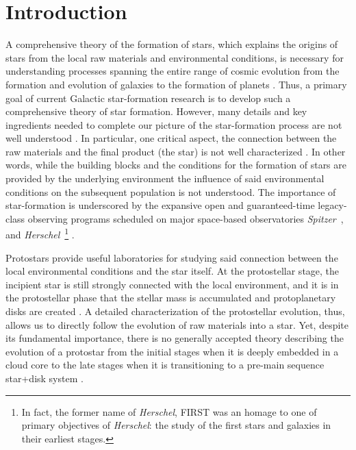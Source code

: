 \documentclass[manuscript]{aastex}
\newcommand{\herschel}{{\em Herschel}}
\newcommand{\spitzer}{{\em Spitzer}}
\begin{document}
\section{Introduction}
\par
A comprehensive theory of the formation of stars, which explains the origins of stars from the local raw materials and environmental conditions, is necessary for understanding processes spanning the entire range of cosmic evolution from the formation and evolution of galaxies to the formation of planets \citep{ke2012}.  Thus, a primary goal of current Galactic star-formation research is to develop such a comprehensive theory of star formation. However, many details and key ingredients needed to complete our picture of the star-formation process are not well understood \citep{mo07}.  In particular, one critical aspect, the connection between the raw materials and the final product (the star) is not well characterized \citep{dunham}.  In other words, while the building blocks and the conditions for the formation of stars are provided by the underlying environment the influence of said environmental conditions on the subsequent population is not understood.  The importance of star-formation is underscored by the expansive open and guaranteed-time legacy-class observing programs scheduled on major space-based observatories \spitzer\ \citep{spitzer}, and \herschel\ \footnote{In fact, the former name of \herschel, FIRST was an homage to one of primary objectives of \herschel: the study of the first stars and galaxies in their earliest stages.} \citep{herschel}.
\par
Protostars provide useful laboratories for studying said connection between the local environmental conditions and the star itself.  At the protostellar stage, the incipient star is still strongly connected with the local environment, and it is in the protostellar phase that the stellar mass is accumulated and protoplanetary disks are created \citep{c2d09}.
A detailed characterization of the protostellar evolution, thus, allows us to directly follow the evolution of raw materials into a star.  Yet, despite its fundamental importance, there is no generally accepted theory describing the evolution of a protostar from the initial stages when it is deeply embedded in a cloud core to the late stages when it is transitioning to a pre-main sequence star+disk system \citep{dunham}.
\par
\end{document}
